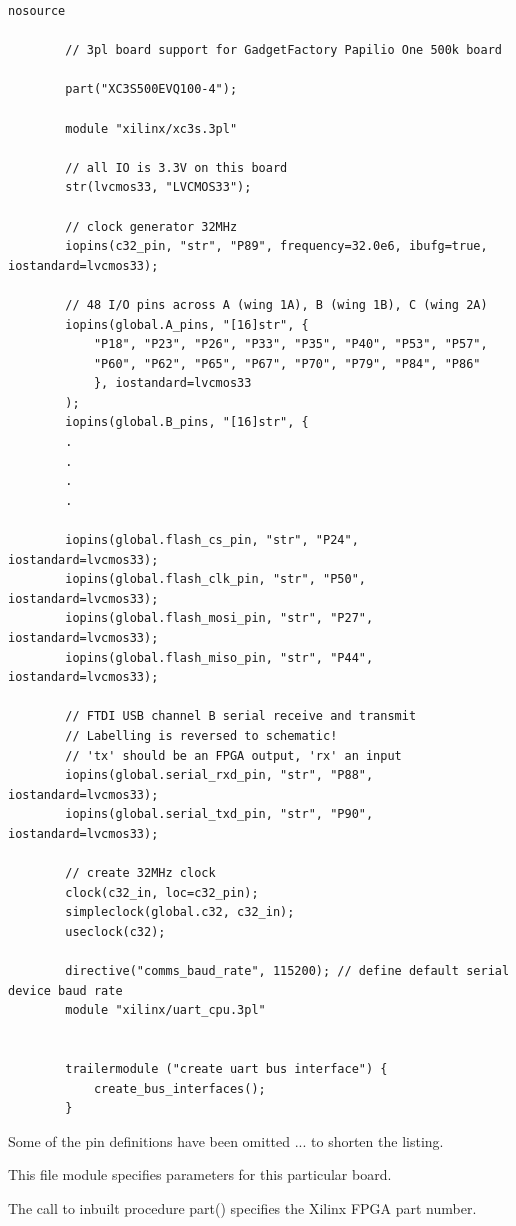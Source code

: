     \begin{lstlisting}[gobble=8, language=threepl]
        nosource

        // 3pl board support for GadgetFactory Papilio One 500k board

        part("XC3S500EVQ100-4");

        module "xilinx/xc3s.3pl"

        // all IO is 3.3V on this board
        str(lvcmos33, "LVCMOS33");

        // clock generator 32MHz
        iopins(c32_pin, "str", "P89", frequency=32.0e6, ibufg=true, iostandard=lvcmos33);

        // 48 I/O pins across A (wing 1A), B (wing 1B), C (wing 2A)
        iopins(global.A_pins, "[16]str", {
	        "P18", "P23", "P26", "P33", "P35", "P40", "P53", "P57",
	        "P60", "P62", "P65", "P67", "P70", "P79", "P84", "P86"
            }, iostandard=lvcmos33
        );
        iopins(global.B_pins, "[16]str", {
        .
        .
        .
        .

        iopins(global.flash_cs_pin, "str", "P24", iostandard=lvcmos33);
        iopins(global.flash_clk_pin, "str", "P50", iostandard=lvcmos33);
        iopins(global.flash_mosi_pin, "str", "P27", iostandard=lvcmos33);
        iopins(global.flash_miso_pin, "str", "P44", iostandard=lvcmos33);

        // FTDI USB channel B serial receive and transmit
        // Labelling is reversed to schematic!
        // 'tx' should be an FPGA output, 'rx' an input
        iopins(global.serial_rxd_pin, "str", "P88", iostandard=lvcmos33);
        iopins(global.serial_txd_pin, "str", "P90", iostandard=lvcmos33);

        // create 32MHz clock
        clock(c32_in, loc=c32_pin);
        simpleclock(global.c32, c32_in);
        useclock(c32);

        directive("comms_baud_rate", 115200); // define default serial device baud rate
        module "xilinx/uart_cpu.3pl"


        trailermodule ("create uart bus interface") {
            create_bus_interfaces();
        }
    \end{lstlisting}
    Some of the pin definitions have been omitted ... to shorten the listing.
    
    This file module specifies parameters for this particular board.
    
    The call to inbuilt procedure part() specifies the Xilinx FPGA part number.
    
